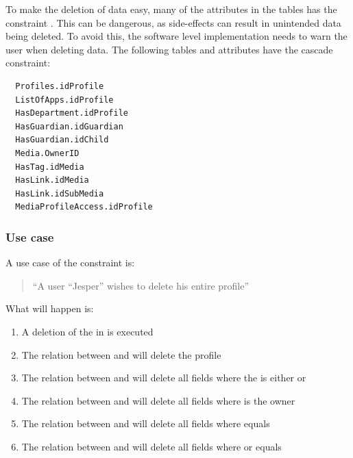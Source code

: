 To make the deletion of data easy, many of the attributes in the tables has the constraint . This can be dangerous, as side-effects can result in unintended data being deleted. To avoid this, the software level implementation needs to warn the user when deleting data. The following tables and attributes have the cascade constraint: 
\begin{verbatim}
  Profiles.idProfile
  ListOfApps.idProfile
  HasDepartment.idProfile
  HasGuardian.idGuardian 
  HasGuardian.idChild 
  Media.OwnerID 
  HasTag.idMedia 
  HasLink.idMedia 
  HasLink.idSubMedia
  MediaProfileAccess.idProfile
\end{verbatim}

\subsubsection*{Use case}
 A use case of the constraint is:
\begin{quotation}
``A user ``Jesper'' wishes to delete his entire profile''
\end{quotation}
What will happen is:
\begin{enumerate}
	\item A deletion of the  in  is executed
	\item The relation between  and  will delete the profile
	\item The relation between  and  will delete all fields where the  is either  or 
	\item The relation between  and  will delete all fields where  is the owner
	\item The relation between  and  will delete all fields where  equals 
	\item The relation between  and  will delete all fields where  or  equals 
\end{enumerate}

